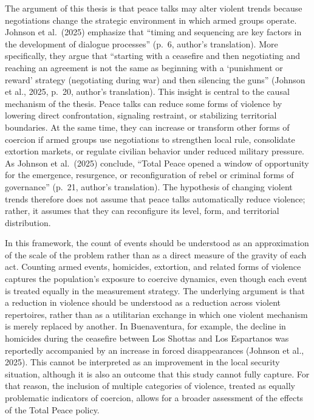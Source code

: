 \documentclass[11pt]{article}
\begin{document}
The argument of this thesis is that peace talks may alter violent trends because negotiations change the strategic environment in which armed groups operate. Johnson et al.~(2025) emphasize that ``timing and sequencing are key factors in the development of dialogue processes'' (p.~6, author's translation). More specifically, they argue that ``starting with a ceasefire and then negotiating and reaching an agreement is not the same as beginning with a `punishment or reward' strategy (negotiating during war) and then silencing the guns'' (Johnson et al., 2025, p.~20, author's translation). This insight is central to the causal mechanism of the thesis. Peace talks can reduce some forms of violence by lowering direct confrontation, signaling restraint, or stabilizing territorial boundaries. At the same time, they can increase or transform other forms of coercion if armed groups use negotiations to strengthen local rule, consolidate extortion markets, or regulate civilian behavior under reduced military pressure. As Johnson et al.~(2025) conclude, ``Total Peace opened a window of opportunity for the emergence, resurgence, or reconfiguration of rebel or criminal forms of governance'' (p.~21, author's translation). The hypothesis of changing violent trends therefore does not assume that peace talks automatically reduce violence; rather, it assumes that they can reconfigure its level, form, and territorial distribution. 

In this framework, the count of events should be understood as an approximation of the scale of the problem rather than as a direct measure of the gravity of each act. Counting armed events, homicides, extortion, and
related forms of violence captures the population's exposure to coercive dynamics, even though each event is treated equally in the measurement strategy. The underlying argument is that a reduction in violence should be understood as a reduction across violent repertoires, rather than as a utilitarian exchange in which one violent mechanism is merely replaced by another. In Buenaventura, for example, the decline in homicides during the ceasefire between Los Shottas and Los Espartanos was reportedly accompanied by an increase in forced disappearances (Johnson et al., 2025). This cannot be interpreted as an improvement in the local security situation, although it is also an outcome that this study cannot fully capture. For that reason, the inclusion of multiple categories of violence, treated as equally problematic indicators of coercion, allows for a broader assessment of the effects of the Total Peace policy. 
\end{document}
